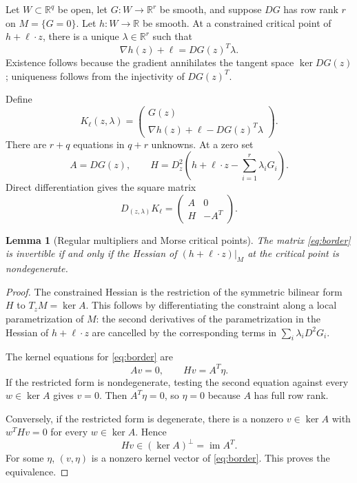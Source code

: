 \documentclass[11pt]{article}
\newtheorem{lemma}[theorem]{Lemma}
\theoremstyle{definition}
\theoremstyle{remark}
\newcommand{\R}{\mathbb R}
\newcommand{\im}{\operatorname{im}}
\begin{document}
Let \(W\subset\R^q\) be open, let \(G:W\to\R^r\) be smooth, and
suppose \(DG\) has row rank \(r\) on \(M=\{G=0\}\). Let \(h:W\to\R\)
be smooth. At a constrained critical point of \(h+\ell\cdot z\), there
is a unique \(\lambda\in\R^r\) such that
\[
 \nabla h(z)+\ell=DG(z)^T\lambda.
\]
Existence follows because the gradient annihilates the tangent space
\(\ker DG(z)\); uniqueness follows from the injectivity of \(DG(z)^T\).

Define
\begin{equation}
 K_\ell(z,\lambda)=
 \begin{pmatrix}
 G(z)\\
 \nabla h(z)+\ell-DG(z)^T\lambda
 \end{pmatrix}.
 \label{eq:critical-general}
\end{equation}
There are \(r+q\) equations in \(q+r\) unknowns. At a zero set
\[
 A=DG(z),\qquad
 H=D_z^2\!\left(h+\ell\cdot z-\sum_{i=1}^r\lambda_iG_i\right).
\]
Direct differentiation gives the square matrix
\begin{equation}
 D_{(z,\lambda)}K_\ell=
 \begin{pmatrix}
 A&0\\
 H&-A^T
 \end{pmatrix}.
 \label{eq:border}
\end{equation}

\begin{lemma}[Regular multipliers and Morse critical points]
\label{lem:border}
The matrix \eqref{eq:border} is invertible if and only if the Hessian
of \((h+\ell\cdot z)|_M\) at the critical point is nondegenerate.
\end{lemma}

\begin{proof}
The constrained Hessian is the restriction of the symmetric bilinear
form \(H\) to \(T_zM=\ker A\). This follows by differentiating the
constraint along a local parametrization of \(M\): the second
derivatives of the parametrization in the Hessian of \(h+\ell\cdot z\) are
cancelled by the corresponding terms in
\(\sum_i\lambda_iD^2G_i\).

The kernel equations for \eqref{eq:border} are
\[
 Av=0,\qquad Hv=A^T\eta.
\]
If the restricted form is nondegenerate, testing the second equation
against every \(w\in\ker A\) gives \(v=0\). Then \(A^T\eta=0\), so
\(\eta=0\) because \(A\) has full row rank.

Conversely, if the restricted form is degenerate, there is a nonzero
\(v\in\ker A\) with \(w^THv=0\) for every \(w\in\ker A\). Hence
\[
 Hv\in(\ker A)^\perp=\im A^T.
\]
For some \(\eta\), \((v,\eta)\) is a nonzero kernel vector of
\eqref{eq:border}. This proves the equivalence.
\end{proof}
\end{document}
